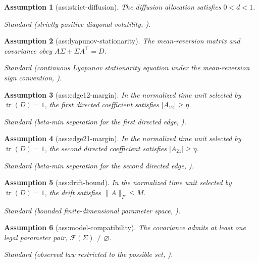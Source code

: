 \documentclass{article}
\newtheorem{assumption}{Assumption}
\begin{document}
\begin{assumption}[ass:strict-diffusion]\label{ass:strict-diffusion}
The diffusion allocation satisfies \(0<d<1\).
\par\smallskip\noindent\emph{Standard} (strictly positive diagonal volatility, \cite{vanSeeventerSalehkaleybar2026}).
\end{assumption}

\begin{assumption}[ass:lyapunov-stationarity]\label{ass:lyapunov-stationarity}
The mean-reversion matrix and covariance obey \(A\Sigma+\Sigma A^{\top}=D\).
\par\smallskip\noindent\emph{Standard} (continuous Lyapunov stationarity equation under the mean-reversion sign convention, \cite{DettlingHomsAmendolaDrtonHansen2023}).
\end{assumption}

\begin{assumption}[ass:edge12-margin]\label{ass:edge12-margin}
In the normalized time unit selected by \(\operatorname{tr}(D)=1\), the first directed coefficient satisfies \(|A_{12}|\ge\eta\).
\par\smallskip\noindent\emph{Standard} (beta-min separation for the first directed edge, \cite{DettlingDrtonKolar2024}).
\end{assumption}

\begin{assumption}[ass:edge21-margin]\label{ass:edge21-margin}
In the normalized time unit selected by \(\operatorname{tr}(D)=1\), the second directed coefficient satisfies \(|A_{21}|\ge\eta\).
\par\smallskip\noindent\emph{Standard} (beta-min separation for the second directed edge, \cite{DettlingDrtonKolar2024}).
\end{assumption}

\begin{assumption}[ass:drift-bound]\label{ass:drift-bound}
In the normalized time unit selected by \(\operatorname{tr}(D)=1\), the drift satisfies \(\lVert A\rVert_F\le M\).
\par\smallskip\noindent\emph{Standard} (bounded finite-dimensional parameter space, \cite{ChernozhukovHongTamer2007}).
\end{assumption}

\begin{assumption}[ass:model-compatibility]\label{ass:model-compatibility}
The covariance admits at least one legal parameter pair, \(\mathcal F(\Sigma)\ne\varnothing\).
\par\smallskip\noindent\emph{Standard} (observed law restricted to the possible set, \cite{vanSeeventerSalehkaleybar2026}).
\end{assumption}
\end{document}
